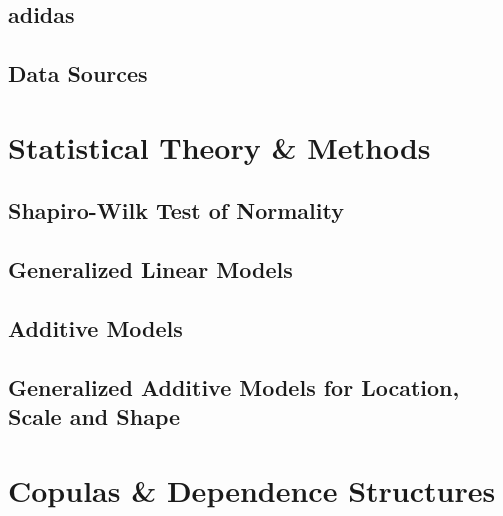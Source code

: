 \documentclass[11pt, twoside]{article}
\numberwithin{equation}{section}
\numberwithin{table}{section}
\numberwithin{figure}{section}
\begin{document}
\subsection{adidas} \label{ssec:adidas}

\subsection{Data Sources} \label{ssec:data_sources}

%
\newpage
\thispagestyle{empty}
\cleardoublepage

\thispagestyle{plain}
\section{Statistical Theory \& Methods} \label{sec:theory_and_methods}

\subsection{Shapiro-Wilk Test of Normality} \label{ssec:shapiro_wilk}

\subsection{Generalized Linear Models} \label{ssec:glm}

%
\subsection{Additive Models} \label{ssec:gam}

\subsection{Generalized Additive Models for Location, Scale and Shape} \label{ssec:gamlss}

\newpage
\thispagestyle{empty}
\cleardoublepage

\thispagestyle{plain}
\section{Copulas \& Dependence Structures} \label{sec:copulas_and_dependence_structures}

\end{document}
